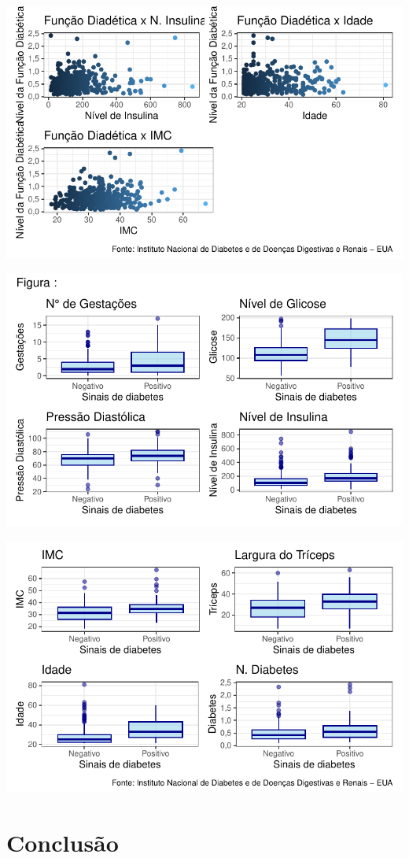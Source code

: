\documentclass[
  twocolumn,
  landscape]{report}
\begin{document}
\includegraphics{relatorio_lab1_files/figure-pdf/unnamed-chunk-11-2.pdf}

\includegraphics{relatorio_lab1_files/figure-pdf/unnamed-chunk-12-1.pdf}

\includegraphics{relatorio_lab1_files/figure-pdf/unnamed-chunk-12-2.pdf}

\hypertarget{conclusuxe3o}{%
\section{Conclusão}\label{conclusuxe3o}}
\end{document}
